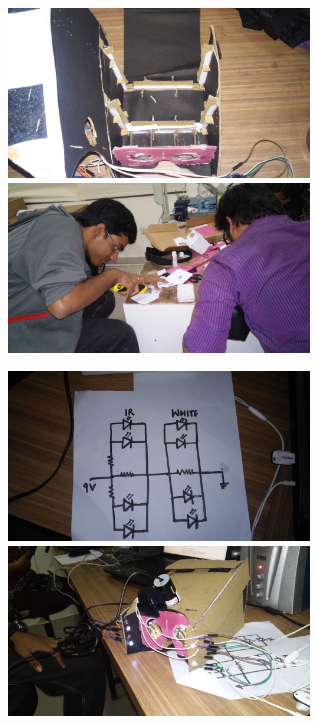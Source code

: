 \documentclass[12pt]{article}
\begin{document}
\includegraphics[width=8cm]{20141225_162257} 
\includegraphics[width=8cm]{20141222_204533} 

\includegraphics[width=8cm]{20141225_171833}
\includegraphics[width=8cm]{20141225_173411} 
\end{document}

